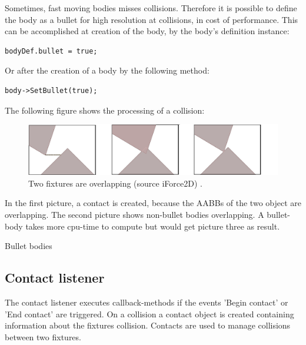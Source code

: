 \documentclass[10pt,a4paper,DIV=11]{scrreprt}
\begin{document}
Sometimes, fast moving bodies misses collisions. Therefore it is possible to define the body as a bullet for high resolution at collisions, in cost of performance.
This can be accomplished at creation of the body, by the body's definition instance:

\begin{lstlisting}[caption={Define fixture as bullet before creation},label=lst:fixture-bullet-before]
bodyDef.bullet = true;
\end{lstlisting}

Or after the creation of a body by the following method:

\begin{lstlisting}[caption={Define fixture as bullet after creation},label=lst:fixture-bullet-after]
body->SetBullet(true);
\end{lstlisting}

The following figure shows the processing of a collision:

\begin{center}
	\begin{figure}[H]
		\centering
		\includegraphics[width=1.0\textwidth,scale=1.0]{files/fixtures-overlap.png}
		\caption{Two fixtures are overlapping (source iForce2D) \cite{box2d-iforce}.}
		\label{fig:fixture-overlap}
	\end{figure}
\end{center}

In the first picture, a contact is created, because the AABBs of the two object are overlapping.
The second picture shows non-bullet bodies overlapping. A bullet-body takes more cpu-time to compute but would get picture three as result.

Bullet bodies

\subsection{Contact listener}
The contact listener executes callback-methods if the events 'Begin contact' or 'End contact' are triggered.
On a collision a contact object is created containing information about the fixtures collision.
Contacts are used to manage collisions between two fixtures.
\end{document}
